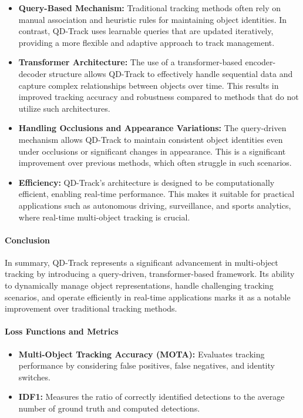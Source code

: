 \documentclass[12pt]{article}
\begin{document}
\begin{itemize}
    \item \textbf{Query-Based Mechanism:} Traditional tracking methods often rely on manual association and heuristic rules for maintaining object identities. In contrast, QD-Track uses learnable queries that are updated iteratively, providing a more flexible and adaptive approach to track management.
    
    \item \textbf{Transformer Architecture:} The use of a transformer-based encoder-decoder structure allows QD-Track to effectively handle sequential data and capture complex relationships between objects over time. This results in improved tracking accuracy and robustness compared to methods that do not utilize such architectures.
    
    \item \textbf{Handling Occlusions and Appearance Variations:} The query-driven mechanism allows QD-Track to maintain consistent object identities even under occlusions or significant changes in appearance. This is a significant improvement over previous methods, which often struggle in such scenarios.
    
    \item \textbf{Efficiency:} QD-Track's architecture is designed to be computationally efficient, enabling real-time performance. This makes it suitable for practical applications such as autonomous driving, surveillance, and sports analytics, where real-time multi-object tracking is crucial.
\end{itemize}

\paragraph{Conclusion}
In summary, QD-Track represents a significant advancement in multi-object tracking by introducing a query-driven, transformer-based framework. Its ability to dynamically manage object representations, handle challenging tracking scenarios, and operate efficiently in real-time applications marks it as a notable improvement over traditional tracking methods.

\paragraph{Loss Functions and Metrics}
\begin{itemize}
    \item \textbf{Multi-Object Tracking Accuracy (MOTA):} Evaluates tracking performance by considering false positives, false negatives, and identity switches.
    \item \textbf{IDF1:} Measures the ratio of correctly identified detections to the average number of ground truth and computed detections.
\end{itemize}
\end{document}
